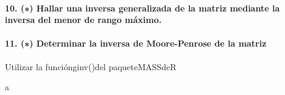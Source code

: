 \documentclass[]{article}
\let\oldparagraph\paragraph
\renewcommand{\paragraph}[1]{\oldparagraph{#1}\mbox{}}
\begin{document}
\hypertarget{hallar-una-inversa-generalizada-de-la-matriz-mediante-la-inversa-del-menor-de-rango-maximo.}{%
\paragraph{10. (∗) Hallar una inversa generalizada de la matriz mediante
la inversa del menor de rango
máximo.}\label{hallar-una-inversa-generalizada-de-la-matriz-mediante-la-inversa-del-menor-de-rango-maximo.}}

\hypertarget{determinar-la-inversa-de-moore-penrose-de-la-matriz}{%
\paragraph{11. (∗) Determinar la inversa de Moore-Penrose de la
matriz}\label{determinar-la-inversa-de-moore-penrose-de-la-matriz}}

Utilizar la funciónginv()del paqueteMASSdeR

a
\end{document}

